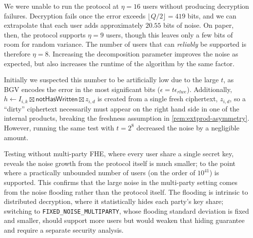 
We were unable to run the protocol at $\eta=16$ users without producing decryption failures. Decryption fails once the error exceeds $\lfloor Q/2 \rfloor = 419$ bits, and we can extrapolate that each user adds approximately $20.55$ bits of noise. On paper, then, the protocol supports $\eta = 9$ users, though this leaves only a few bits of room for random variance. The number of users that can \emph{reliably} be supported is therefore $\eta = 8$. Increasing the decomposition parameter improves the noise as expected, but also increases the runtime of the algorithm by the same factor.

Initially we suspected this number to be artificially low due to the large $t$, as BGV encodes the error in the most significant bits ($\epsilon = t\epsilon_{rlwe}$). Additionally, $h \gets I_{i,k}\boxtimes\mathsf{notHasWritten}\boxtimes z_{i,d}$ is created from a single fresh ciphertext, $z_{i,d}$, so a ``dirty'' ciphertext necessarily must appear on the right hand side in one of the internal products, breaking the freshness assumption in \cref{rem:extprod-asymmetry}. However, running the same test with $t=2^8$ decreased the noise by a negligible amount.



Testing without multi-party FHE, where every user share a single secret key, reveals the noise growth from the protocol itself is much smaller; to the point where a practically unbounded number of users (on the order of ${10^{41}}$) is supported. This confirms that the large noise in the multi-party setting comes from the noise flooding rather than the protocol itself. The flooding is intrinsic to distributed decryption, where it statistically hides each party's key share; switching to \texttt{FIXED\_NOISE\_MULTIPARTY}, whose flooding standard deviation is fixed and smaller, should support more users but would weaken that hiding guarantee and require a separate security analysis.

\vfill